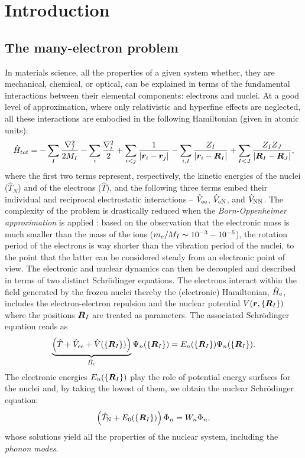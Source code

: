 \cleardoublepage
\chapter{Introduction\label{ch:introduction}}

\section{The many-electron problem}
In materials science, all the properties of a given system whether, they are mechanical, chemical, or optical, can be explained in terms of the fundamental interactions between their elemental components: electrons and nuclei. At a good level of approximation, where only relativistic and hyperfine effects are neglected, all these interactions are embodied in the following Hamiltonian (given in atomic units):
%
\begin{equation}
    \hat{H}_{tot} = - \sum_I \frac{\nabla_I^2}{2M_I} - \sum_i \frac{\nabla_i^2}{2} + \sum_{i < j} \frac{1}{|{\bm r}_i - {\bm r}_j|} - \sum_{i,I} \frac{Z_I}{|{\bm r}_i - {\bm R}_I|} + \sum_{I < J} \frac{Z_I Z_J}{|{\bm R}_I - {\bm R}_J|} ,
    \label{eq:many-body}
\end{equation}
%
where the first two terms represent, respectively, the kinetic energies of the nuclei ($\hat{T}_N$) and of the electrons ($\hat{T}$), and the following three terms embed their individual and reciprocal electrostatic interactions -- $\hat{V}_{\rm ee}$, $\hat{V}_{\rm eN}$, and $\hat{V}_{\rm NN}$. The complexity of the problem is drastically reduced when the \emph{Born-Oppenheimer approximation} is applied \cite{born_zur_1927}: based on the observation that the electronic mass is much smaller than the mass of the ions ($m_e / M_I \thicksim 10^{-3} - 10^{-5}$), the rotation period of the electrons is way shorter than the vibration period of the nuclei, to the point that the latter can be considered steady from an electronic point of view. The electronic and nuclear dynamics can then be decoupled and described in terms of two distinct Schr\"{o}dinger equations. The electrons interact within the field generated by the frozen nuclei thereby the (electronic) Hamiltonian, $\hat{H}_{\rm e}$, includes the electron-electron repulsion and the nuclear potential $V({\bm r},\{ {\bm R}_I \})$ where the positions ${\bm R}_I$ are treated as parameters. The associated Schr\"{o}dinger equation reads as
%
\begin{equation}
    \underbrace{\left( \hat{T} + \hat{V}_{\rm ee} + \hat{V}(\{ {\bm R}_I \}) \right)}_{\hat{H}_{\rm e}} \Psi_n(\{ {\bm R}_I \}) = E_n(\{ {\bm R}_I \}) \Psi_n(\{ {\bm R}_I \}) .
    \label{eq:many-electron-problem}
\end{equation}
%
The electronic energies $E_n(\{ {\bm R}_I \})$ play the role of potential energy surfaces for the nuclei and, by taking the lowest of them, we obtain the nuclear Schr\"{o}dinger equation:
%
\begin{equation}
    \left( \hat{T}_{\rm N} + E_0(\{ {\bm R}_I \}) \right) \Phi_n = W_n \Phi_n ,
    \label{eq:nuclear-schrodinger-eq}
\end{equation}
%
whose solutions yield all the properties of the nuclear system, including the \emph{phonon modes}.

